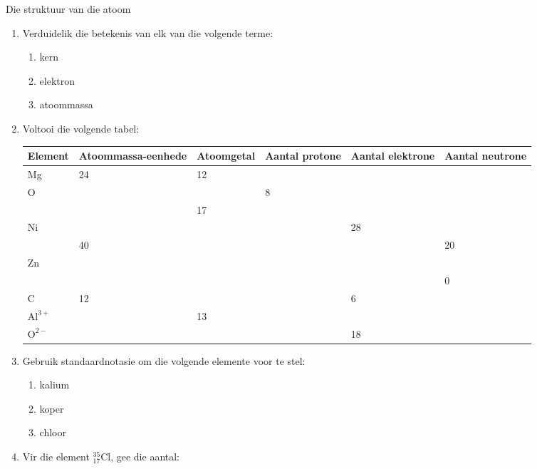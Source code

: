 \begin{exercises}{Die struktuur van die atoom} \noindent
\begin{enumerate}[noitemsep, label=\textbf{\arabic*}. ] 
\item Verduidelik die betekenis van elk van die volgende terme:
\begin{enumerate}[noitemsep, label=\textbf{\alph*}. ] 
\item kern
\item elektron
\item atoommassa
\end{enumerate}
\item Voltooi die volgende tabel:
\begin{center} 
\begin{tabular}{|p{1.4cm}|p{1.4cm}|p{1.4cm}|p{1.4cm}|p{1.4cm}|p{1.4cm}|}\hline
\textbf{Element} & \textbf{Atoom\-massa-eenhede} & \textbf{Atoomgetal} & \textbf{Aantal protone} & \textbf{Aantal elektrone} & \textbf{Aantal neutrone}\\\hline
Mg & 24 & 12 & & & \\\hline
O & & & 8 & & \\\hline
 & & 17 & & & \\\hline
Ni & & & & 28 & \\\hline
 & 40 & & & & 20 \\\hline
Zn & & & & & \\\hline
 & & & & & 0 \\\hline
C & 12 & & & 6 & \\\hline 
$\text{Al}^{3+}$ &  & 13 & & &  \\ \hline
$\text{O}^{2-}$ & & & & 18 &  \\ \hline
\end{tabular}
\end{center}
    \par
          \item Gebruik standaardnotasie om die volgende elemente voor te stel:
\begin{enumerate}[noitemsep, label=\textbf{\alph*}. ] 
            \item kalium
\item koper
\item chloor
\end{enumerate}
                \item 
Vir die element $_{17}^{35}\text{Cl}$, gee die aantal:
\begin{enumerate}[noitemsep, label=\textbf{\alph*}. ] 

\end{enumerate}
\end{enumerate}
\end{exercises}
